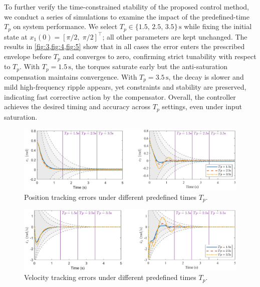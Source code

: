 \documentclass[pdflatex,sn-mathphys-num]{sn-jnl}%
\theoremstyle{thmstyleone}%
\theoremstyle{thmstyletwo}%
\theoremstyle{thmstylethree}%
\begin{document}
To further verify the time-constrained stability of the proposed control method, we conduct a series of simulations to examine the impact of the predefined-time $T_p$ on system performance. We select $T_p \in \{1.5,\,2.5,\,3.5\}\,\mathrm{s}$ while fixing the initial state at $x_1(0) = [\pi/2,\;\pi/2]^{\!\top}$; all other parameters are kept unchanged. 
The results in \cref{fig:3,fig:4,fig:5} show that in all cases the error enters the prescribed envelope before $T_p$ and converges to zero, confirming strict tunability with respect to $T_p$. With $T_p=1.5\,\mathrm{s}$, the torques saturate early but the anti-saturation compensation maintains convergence. With $T_p=3.5\,\mathrm{s}$, the decay is slower and mild high-frequency ripple appears, yet constraints and stability are preserved, indicating fast corrective action by the compensator. Overall, the controller achieves the desired timing and accuracy across $T_p$ settings, even under input saturation.




\begin{figure}[H]
	\centering
	\includegraphics[width=0.9\linewidth]{fig3.eps}
	\caption{Position tracking errors under different predefined times \(T_p\).}
	\label{fig:3}
\end{figure}

\begin{figure}[H]
	\centering
	\includegraphics[width=0.9\linewidth]{fig4.eps}
	\caption{Velocity tracking errors under different predefined times \(T_p\).}
	\label{fig:4}
\end{figure}

\end{document}
